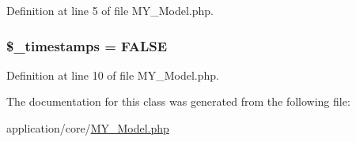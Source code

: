 Definition at line 5 of file M\-Y\-\_\-\-Model.\-php.

\hypertarget{class_m_y___model_aa701f5b72d73b3c5a7516cd6221c60cc}{
\subsubsection[{\$\-\_\-timestamps}]{\setlength{\rightskip}{0pt plus 5cm}\$\-\_\-timestamps = F\-A\-L\-S\-E\hspace{0.3cm}{\ttfamily [protected]}}}\label{class_m_y___model_aa701f5b72d73b3c5a7516cd6221c60cc}


Definition at line 10 of file M\-Y\-\_\-\-Model.\-php.



The documentation for this class was generated from the following file\-:\begin{DoxyCompactItemize}
\item 
application/core/\hyperlink{_m_y___model_8php}{M\-Y\-\_\-\-Model.\-php}\end{DoxyCompactItemize}
